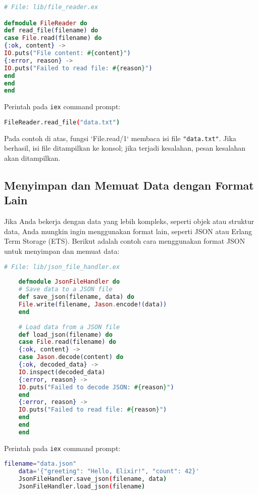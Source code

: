 \begin{lstlisting}[language=Elixir]
# File: lib/file_reader.ex

defmodule FileReader do
def read_file(filename) do
case File.read(filename) do
{:ok, content} ->
IO.puts("File content: #{content}")
{:error, reason} ->
IO.puts("Failed to read file: #{reason}")
end
end
end
\end{lstlisting}

Perintah pada \texttt{iex} command prompt: 

\begin{lstlisting}[language=bash]
	FileReader.read_file("data.txt")
\end{lstlisting}

Pada contoh di atas, fungsi `File.read/1` membaca isi file \texttt{"data.txt"}. Jika berhasil, isi file ditampilkan ke konsol; jika terjadi kesalahan, pesan kesalahan akan ditampilkan.

\subsection{Menyimpan dan Memuat Data dengan Format Lain}

Jika Anda bekerja dengan data yang lebih kompleks, seperti objek atau struktur data, Anda mungkin ingin menggunakan format lain, seperti JSON atau Erlang Term Storage (ETS). Berikut adalah contoh cara menggunakan format JSON untuk menyimpan dan memuat data:

\begin{lstlisting}[language=Elixir]
	# File: lib/json_file_handler.ex
	
	defmodule JsonFileHandler do
	# Save data to a JSON file
	def save_json(filename, data) do
	File.write(filename, Jason.encode!(data))
	end
	
	# Load data from a JSON file
	def load_json(filename) do
	case File.read(filename) do
	{:ok, content} ->
	case Jason.decode(content) do
	{:ok, decoded_data} ->
	IO.inspect(decoded_data)
	{:error, reason} ->
	IO.puts("Failed to decode JSON: #{reason}")
	end
	{:error, reason} ->
	IO.puts("Failed to read file: #{reason}")
	end
	end
	end

\end{lstlisting}

Perintah pada \texttt{iex} command prompt: 

\begin{lstlisting}[language=bash]
	filename="data.json"
	data='{"greeting": "Hello, Elixir!", "count": 42}'
	JsonFileHandler.save_json(filename, data)
	JsonFileHandler.load_json(filename)
\end{lstlisting}

